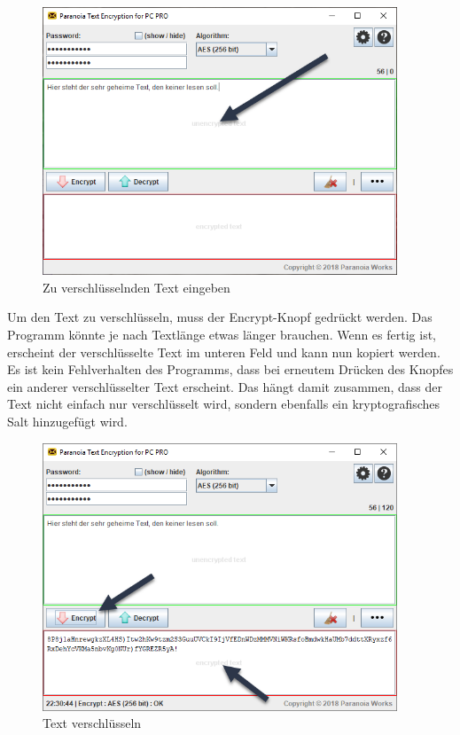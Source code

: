 \documentclass[12pt,a4paper]{scrreprt}
\begin{document}
\begin{figure}[h]
\begin{center}
\includegraphics[width=300pt]{media/pte2.png}
\caption{Zu verschlüsselnden Text eingeben}
\label{pte2}
\end{center}
\end{figure}

\noindent Um den Text zu verschlüsseln, muss der Encrypt-Knopf gedrückt werden. Das Programm könnte je nach Textlänge etwas länger brauchen. Wenn es fertig ist, erscheint der verschlüsselte Text im unteren Feld und kann nun kopiert werden. Es ist kein Fehlverhalten des Programms, dass bei erneutem Drücken des Knopfes ein anderer verschlüsselter Text erscheint. Das hängt damit zusammen, dass der Text nicht einfach nur verschlüsselt wird, sondern ebenfalls ein kryptografisches Salt hinzugefügt wird.

\begin{figure}[h]
\begin{center}
\includegraphics[width=300pt]{media/pte3.png}
\caption{Text verschlüsseln}
\label{pte3}
\end{center}
\end{figure}
\end{document}
